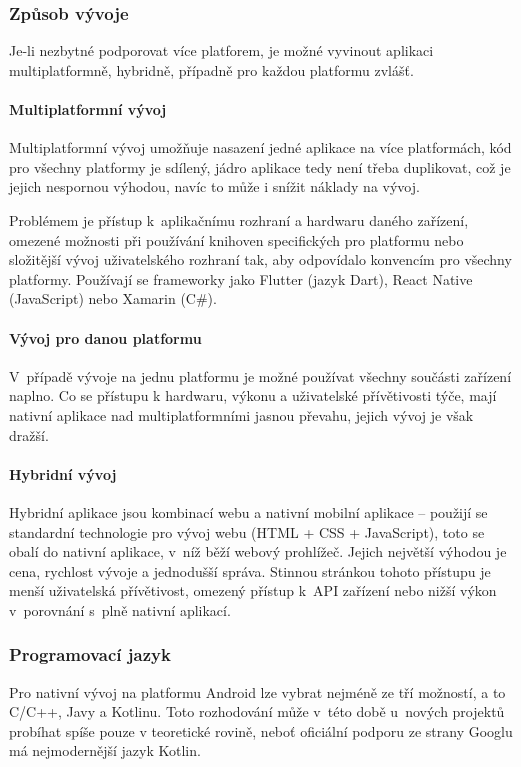 \documentclass[twoside]{ctuthesis}
\begin{document}
\subsubsection{Způsob vývoje}

Je-li nezbytné podporovat více platforem, je možné vyvinout aplikaci multiplatformně, hybridně, případně pro každou platformu zvlášť.

\paragraph{Multiplatformní vývoj}
Multiplatformní vývoj umožňuje nasazení jedné aplikace na více platformách, kód pro všechny platformy je sdílený, jádro aplikace tedy není třeba duplikovat, což je jejich nespornou výhodou, navíc to může i snížit náklady na vývoj.

Problémem je přístup k~aplikačnímu rozhraní a hardwaru daného zařízení, omezené možnosti při používání knihoven specifických pro platformu nebo složitější vývoj uživatelského rozhraní tak, aby odpovídalo konvencím pro všechny platformy. \cite{manchanda2020where}   Používají se frameworky jako Flutter (jazyk Dart), React Native (JavaScript) nebo Xamarin (C\#).

\paragraph{Vývoj pro danou platformu}
V~případě vývoje na jednu platformu je možné používat všechny součásti zařízení naplno. Co se přístupu k hardwaru, výkonu a uživatelské přívětivosti týče, mají nativní aplikace nad multiplatformními jasnou převahu, jejich vývoj je však dražší. \cite{dennis2018native}

\paragraph{Hybridní vývoj}
Hybridní aplikace jsou kombinací webu a nativní mobilní aplikace – použijí se standardní technologie pro vývoj webu (HTML + CSS + JavaScript), toto se obalí do nativní aplikace, v~níž běží webový prohlížeč. Jejich největší výhodou je cena, rychlost vývoje a jednodušší správa. Stinnou stránkou tohoto přístupu je menší uživatelská přívětivost, omezený přístup k~API zařízení nebo nižší výkon v~porovnání s~plně nativní aplikací. \cite{design2020ultimate}


\subsubsection{Programovací jazyk}
Pro nativní vývoj na platformu Android lze vybrat nejméně ze tří možností, a to C/C++, Javy a Kotlinu. Toto rozhodování může v~této době u~nových projektů probíhat spíše pouze v teoretické rovině, neboť oficiální podporu ze strany Googlu má nejmodernější jazyk Kotlin.
\end{document}
